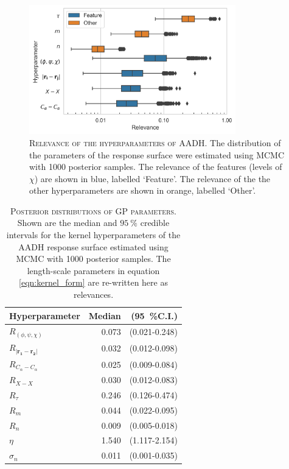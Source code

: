 \begin{figure}
    \centering
    \includegraphics[width=0.8\textwidth]{chapters/msm_optimization/figures/AADH_relevance_d.png}
    \caption[Relevance of the hyperparameters of AADH]{\textsc{Relevance of the hyperparameters of AADH}. The distribution of the parameters of the response surface were estimated using MCMC with \num{1000} posterior samples. The relevance of the features (levels of $\chi$) are shown in blue, labelled `Feature'. The relevance of the the other hyperparameters are shown in orange, labelled `Other'.}
    \label{fig:aadh_relevance}
\end{figure}

\begin{table}
    \centering
    \begin{tabular}{lrr}
    \toprule
                             Hyperparameter &  Median &     (\SI{95}{\percent}C.I.) \\
    \midrule
                    $R_{(\phi, \psi, \chi)}$ &   0.073 &  (0.021-0.248) \\
     $R_{|\mathbf{r_{1}} - \mathbf{r_{2}}|}$ &   0.032 &  (0.012-0.098) \\
                 $R_{C_{\alpha}-C_{\alpha}}$ &   0.025 &  (0.009-0.084) \\
                                  $R_{X-X}$ &   0.030 &  (0.012-0.083) \\
                                  $R_{\tau}$ &   0.246 &  (0.126-0.474) \\
                                     $R_{m}$ &   0.044 &  (0.022-0.095) \\
                                     $R_{n}$ &   0.009 &  (0.005-0.018) \\
                                      $\eta$ &   1.540 &  (1.117-2.154) \\
                                  $\sigma_n$ &   0.011 &  (0.001-0.035) \\
    \bottomrule
    \end{tabular}
    \caption[Posterior distributions of GP parameters]{\textsc{Posterior distributions of GP parameters}. Shown are the median and $\SI{95}{\percent}$ credible intervals for the kernel hyperparameters of the AADH response surface estimated using MCMC with \num{1000} posterior samples. The length-scale parameters in equation \ref{eqn:kernel_form} are re-written here as relevances.}
    \label{tab:aadh_rel}
\end{table}

